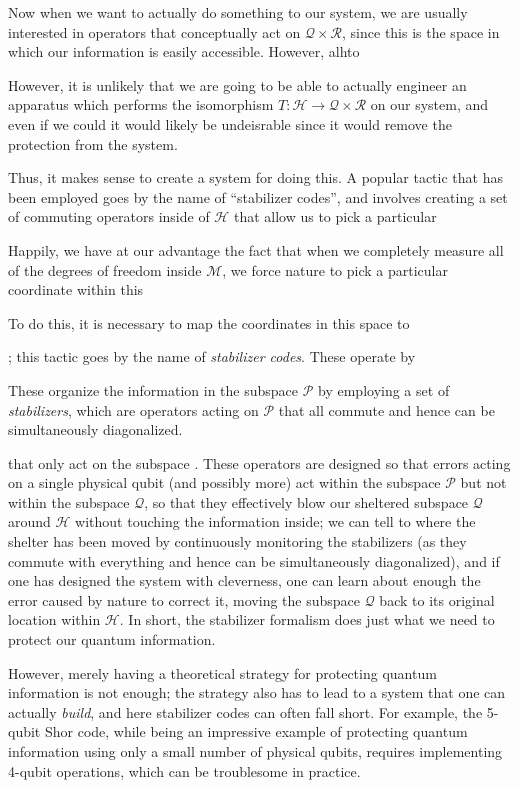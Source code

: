 \documentclass[twocolumn,showpacs,preprintnumbers,amsmath,amssymb,nofootinbib,pra,floatfix]{revtex4}
\begin{document}
Now when we want to actually do something to our system, we are usually interested in operators that conceptually act on $\mathscr{Q}\times\mathscr{R}$, since this is the space in which our information is easily accessible.  However, alhto


  However, it is unlikely that we are going to be able to actually engineer an apparatus which performs the isomorphism $T:\mathscr{H}\to\mathscr{Q}\times\mathscr{R}$ on our system, and even if we could it would likely be undeisrable since it would remove the protection from the system.  

Thus, it makes sense to create a system for doing this.  A popular tactic that has been employed goes by the name of ``stabilizer codes'', and involves creating a set of commuting operators inside of $\mathscr{H}$ that allow us to pick a particular 

  Happily, we have at our advantage the fact that when we completely measure all of the degrees of freedom inside $\mathscr{M}$, we force nature to pick a particular coordinate within this

To do this, it is necessary to map the coordinates in this space to 

;  this tactic goes by the name of  \emph{stabilizer codes}.  These operate by 

These organize the information in the subspace $\mathscr{P}$ by employing a set of \emph{stabilizers}, which are operators acting on $\mathscr{P}$ that all commute and hence can be simultaneously diagonalized.

 that only act on the subspace .  These operators are designed so that errors acting on a single physical qubit (and possibly more) act within the subspace $\mathscr{P}$ but not within the subspace $\mathscr{Q}$, so that they effectively blow our sheltered subspace $\mathscr{Q}$ around $\mathscr{H}$ without touching the information inside;  we can tell to where the shelter has been moved by continuously monitoring the stabilizers (as they commute with everything and hence can be simultaneously diagonalized), and if one has designed the system with cleverness, one can learn about enough the error caused by nature to correct it, moving the subspace $\mathscr{Q}$ back to its original location within $\mathscr{H}$.  In short, the stabilizer formalism does  just what we need to protect our quantum information.

However, merely having a theoretical strategy for protecting quantum information is not enough;  the strategy also has to lead to a system that one can actually \emph{build}, and here stabilizer codes can often fall short.  For example, the 5-qubit Shor code, while being an impressive example of protecting quantum information using only a small number of physical qubits, requires implementing 4-qubit operations, which can be troublesome in practice.
\end{document}
